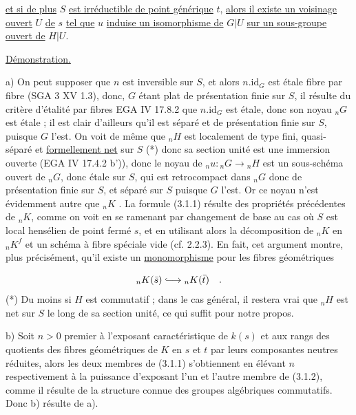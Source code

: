 
\underline{et si de plus} $S$ \underline{est irréductible de point générique} $t$, \underline{alors il existe un voisinage ouvert} $U$ \underline{de} $s$ \underline{tel que} $u$ \underline{induise un isomorphisme de} $G|U$ \underline{sur un sous-groupe ouvert de} $H|U$.

\underline{Démonstration.}

a) On peut supposer que $n$ est inversible sur $S$, et alors $n.\mathrm{id}_{G}$ est étale fibre par fibre (SGA 3 XV 1.3), donc, $G$ étant plat de présentation finie sur $S$, il résulte du critère d'étalité par fibres EGA IV 17.8.2 que $n.\mathrm{id}_{G}$ est étale, donc son noyau ${}_{n}G$ est étale ; il est clair d'ailleurs qu'il est séparé et de présentation finie sur $S$, puisque $G$ l'est. On voit de même que ${}_{n}H$ est localement de type fini, quasi-séparé et \underline{formellement net} sur $S$ (*) donc sa section unité est une immersion ouverte (EGA IV 17.4.2 b')), donc le noyau de ${}_{n}u: {}_{n}G \longrightarrow {}_{n}H$ est un sous-schéma ouvert de ${}_{n}G$, donc étale sur $S$, qui est retrocompact dans ${}_{n}G$ donc de présentation finie sur $S$, et séparé sur $S$ puisque $G$ l'est. Or ce noyau n'est évidemment autre que ${}_{n}K$ . La formule (3.1.1) résulte des propriétés précédentes de ${}_{n}K$, comme on voit en se ramenant par changement de base au cas où $S$ est local hensélien de point fermé $s$, et en utilisant alors la décomposition de ${}_{n}K$ en ${}_{n}K^{f}$ et un schéma à fibre spéciale vide (cf. 2.2.3). En fait, cet argument montre, plus précisément, qu'il existe un \underline{monomorphisme} pour les fibres géométriques

\begin{equation*}
{}_{n}K(\bar{s}) \lhook\joinrel\longrightarrow {}_{n}K(\bar{t}) \quad .
\end{equation*}
(*) Du moins si $H$ est commutatif ; dans le cas général, il restera vrai que ${}_{n}H$ est net sur $S$ le long de sa section unité, ce qui suffit pour notre propos.



b)   Soit $n > 0$ premier à l'exposant caractéristique de $k(s)$ et aux rangs des quotients des fibres géométriques de $K$ en $s$ et $t$ par leurs composantes neutres réduites, alors les deux membres de (3.1.1) s'obtiennent en élévant $n$ respectivement à la puissance d'exposant l'un et l'autre membre de (3.1.2), comme il résulte de la structure connue des groupes algébriques commutatifs. Donc b) résulte de a).

